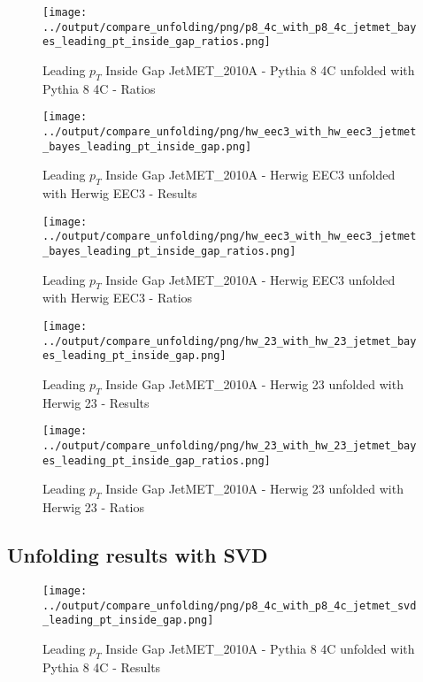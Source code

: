 \documentclass[11pt]{book}
\begin{document}
\begin{figure}[ht]
\centering
\texttt{[image: ../output/compare\_unfolding/png/p8\_4c\_with\_p8\_4c\_jetmet\_bayes\_leading\_pt\_inside\_gap\_ratios.png]}
\caption{Leading $p_{T}$ Inside Gap JetMET\_2010A - Pythia 8 4C unfolded with Pythia 8 4C - Ratios}
\label{p8_p8_jetmet_bayes_leading_pt_inside_gap_b}
\end{figure}

\begin{figure}[ht]
\centering
\texttt{[image: ../output/compare\_unfolding/png/hw\_eec3\_with\_hw\_eec3\_jetmet\_bayes\_leading\_pt\_inside\_gap.png]}
\caption{Leading $p_{T}$ Inside Gap JetMET\_2010A - Herwig EEC3 unfolded with Herwig EEC3 - Results}
\label{hw_eec3_hw_eec3_jetmet_bayes_leading_pt_inside_gap_a}
\end{figure}

\begin{figure}[ht]
\centering
\texttt{[image: ../output/compare\_unfolding/png/hw\_eec3\_with\_hw\_eec3\_jetmet\_bayes\_leading\_pt\_inside\_gap\_ratios.png]}
\caption{Leading $p_{T}$ Inside Gap JetMET\_2010A - Herwig EEC3 unfolded with Herwig EEC3 - Ratios}
\label{hw_eec3_hw_eec3_jetmet_bayes_leading_pt_inside_gap_b}
\end{figure}

\begin{figure}[ht]
\centering
\texttt{[image: ../output/compare\_unfolding/png/hw\_23\_with\_hw\_23\_jetmet\_bayes\_leading\_pt\_inside\_gap.png]}
\caption{Leading $p_{T}$ Inside Gap JetMET\_2010A - Herwig 23 unfolded with Herwig 23 - Results}
\label{hw_23_hw_23_jetmet_bayes_leading_pt_inside_gap_a}
\end{figure}

\begin{figure}[ht]
\centering
\texttt{[image: ../output/compare\_unfolding/png/hw\_23\_with\_hw\_23\_jetmet\_bayes\_leading\_pt\_inside\_gap\_ratios.png]}
\caption{Leading $p_{T}$ Inside Gap JetMET\_2010A - Herwig 23 unfolded with Herwig 23 - Ratios}
\label{hw_23_hw_23_jetmet_bayes_leading_pt_inside_gap_b}
\end{figure}


\clearpage
\subsection{Unfolding results with SVD}

\begin{figure}[ht]
\centering
\texttt{[image: ../output/compare\_unfolding/png/p8\_4c\_with\_p8\_4c\_jetmet\_svd\_leading\_pt\_inside\_gap.png]}
\caption{Leading $p_{T}$ Inside Gap JetMET\_2010A - Pythia 8 4C unfolded with Pythia 8 4C - Results}
\label{p8_p8_jetmet_svd_leading_pt_inside_gap_a}
\end{figure}
\end{document}

